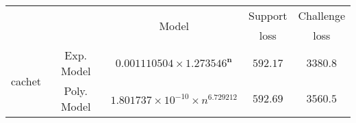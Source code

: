 \begin{tabular}{ccccc} 
\hline 
 &  & \multirow{2}{*}{Model} & Support & Challenge\tabularnewline 
 &  &  & loss  & loss\tabularnewline 
\hline 
\hline 
\multirow{2}{*}{cachet} & Exp. Model & $\mathbf{0.001110504\times 1.273546^{n}}$ & $\mathbf{592.17}$ & $\mathbf{3380.8}$ \tabularnewline 
 & Poly. Model & $1.801737\times10^{-10}\times n^{6.729212}$ & $592.69$ & $3560.5$ \tabularnewline 
\hline 
\end{tabular} 

